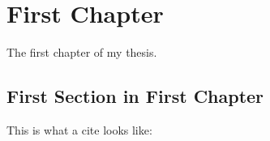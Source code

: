\chapter{First Chapter}
The first chapter of my thesis.

\section{First Section in First Chapter}
This is what a cite looks like: \cite{malinowski_using_nodate}
